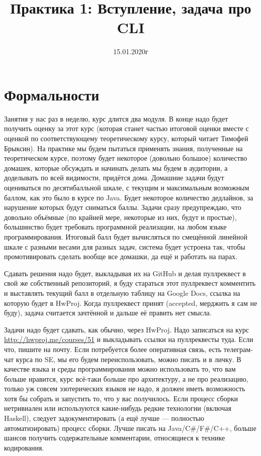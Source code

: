 \documentclass[a5paper]{article}
\title{Практика 1: Вступление, задача про CLI}
\date{15.01.2020г}
\begin{document}
\maketitle
\thispagestyle{empty}

\section{Формальности}
Занятия у нас раз в неделю, курс длится два модуля. В конце надо будет получить оценку за этот курс (которая станет частью итоговой оценки вместе с оценкой по соответствующему теоретическому курсу, который читает Тимофей Брыксин). На практике мы будем пытаться применять знания, полученные на теоретическом курсе, поэтому будет некоторое (довольно большое) количество домашек, которые обсуждать и начинать делать мы будем в аудитории, а доделывать по всей видимости, придётся дома. Домашние задачи будут оцениваться по десятибалльной шкале, с текущим и максимальным возможным баллом, как это было в курсе по Java. Будет некоторое количество дедлайнов, за нарушение которых будут сниматься баллы. Задачи сразу предупреждаю, что довольно объёмные (по крайней мере, некоторые из них, будут и простые), большинство будет требовать программной реализации, на любом языке программирования. Итоговый балл будет вычисляться по смещённой линейной шкале с разными весами для разных задач, система будет устроена так, чтобы промотивировать сделать вообще все домашки, да ещё и работать на парах.

Сдавать решения надо будет, выкладывая их на GitHub и делая пуллреквест в свой же собственный репозиторий, я буду стараться этот пуллреквест комментить и выставлять текущий балл в отдельную таблицу на Google Docs, ссылка на которую будет в HwProj. Когда пуллреквест принят (accepted, мерджить я сам не буду), задача считается зачтённой и дальше её править нет смысла.

Задачи надо будет сдавать, как обычно, через HwProj. Надо записаться на курс \url{http://hwproj.me/courses/51} и выкладывать ссылки на пуллреквесты туда. Если что, пишите на почту. Если потребуется более оперативная связь, есть телеграм-чат курса по SE, мы его будем переиспользовать, можно писать и в личку. В качестве языка и среды программирования можно использовать то, что вам больше нравится, курс всё-таки больше про архитектуру, а не про реализацию, только уж совсем эзотерических языков не надо, я должен иметь возможность хотя бы собрать и запустить то, что у вас получилось. Если процесс сборки нетривиален или используются какие-нибудь редкие технологии (включая Haskell), следует задокументировать (а ещё лучше --- полностью автоматизировать) процесс сборки. Лучше писать на Java/C\#/F\#/C++, больше шансов получить содержательные комментарии, относящиеся к технике кодирования.
\end{document}
